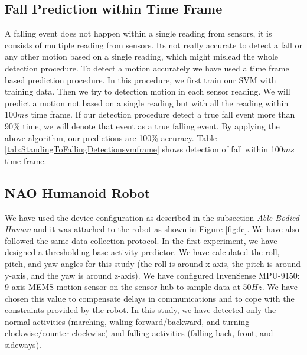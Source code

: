 \documentclass[letterpaper]{article}
\begin{document}
\subsection{Fall Prediction within Time Frame}

A falling event does not happen within a single reading from sensors, it is consists of multiple
reading from sensors.  Its not really accurate to detect a fall or any other motion based on a
single reading, which might mislead the whole detection procedure. To detect a motion accurately we
have used a time frame based prediction procedure. In this procedure, we first train our SVM with
training data. Then we try to detection motion in each sensor reading. We will predict a motion not
based on a single reading but with all the reading within 100$ms$ time frame. If our detection
procedure detect a true fall event more than 90\% time, we will denote that event as a true
falling event. By applying the above algorithm, our predictions are 100\% accuracy.
Table \ref{tab:StandingToFallingDetectionsvmframe} shows detection of fall within 100$ms$ time
frame.
 
%

\subsection{NAO Humanoid Robot}

We have used the device configuration as described  in the subsection {\em Able-Bodied Human} 
and it was attached to the robot as shown in Figure \ref{fig:fc}. We have also followed the same 
data collection protocol. In the first experiment, we have designed a thresholding base activity 
predictor. We have calculated the roll, pitch, and yaw angles for this study (the roll is around 
x-axis, the pitch is around y-axis, and the yaw is around z-axis). We have configured InvenSense 
MPU-9150: 9-axis MEMS motion sensor on the sensor hub to sample data
at 50$Hz$. We have chosen this value to compensate delays in communications and to cope with the
constraints provided by the robot. In this study, we have detected only the normal 
activities (marching, waling forward/backward, and turning clockwise/counter-clockwise)
and falling activities (falling back, front, and sideways). 
\end{document}

